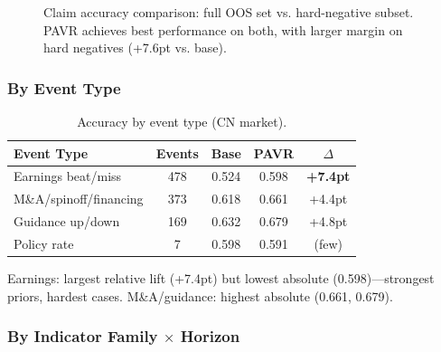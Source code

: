 \documentclass[sigconf, anonymous, review]{acmart}
\begin{document}
\begin{figure}[t]
\centering
{}
\caption{Claim accuracy comparison: full OOS set vs. hard-negative subset. PAVR achieves best performance on both, with larger margin on hard negatives (+7.6pt vs. base).}
\label{fig:results}
\end{figure}

\subsubsection{By Event Type}

\begin{table}[t]
\centering\small
\caption{Accuracy by event type (CN market).}
\label{tab:bytype}
\begin{tabular}{@{}lcccc@{}}
\toprule
Event Type & Events & Base & PAVR & $\Delta$ \\
\midrule
Earnings beat/miss & 478 & 0.524 & 0.598 & \textbf{+7.4pt} \\
M\&A/spinoff/financing & 373 & 0.618 & 0.661 & +4.4pt \\
Guidance up/down & 169 & 0.632 & 0.679 & +4.8pt \\
Policy rate & 7 & 0.598 & 0.591 & (few) \\
\bottomrule
\end{tabular}
\end{table}

Earnings: largest relative lift (+7.4pt) but lowest absolute (0.598)---strongest priors, hardest cases. M\&A/guidance: highest absolute (0.661, 0.679).

\subsubsection{By Indicator Family $\times$ Horizon}
\end{document}
